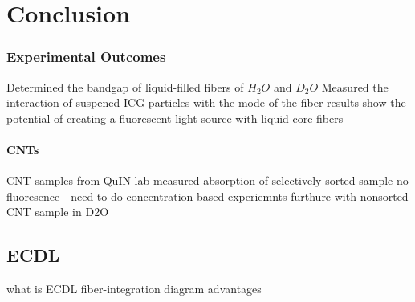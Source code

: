 \chapter{Conclusion}
\subsection{Experimental Outcomes}
Determined the bandgap of liquid-filled fibers of $H_2O$ and $D_2O$ 
Measured the interaction of suspened ICG particles with the mode of the fiber
results show the potential of creating a fluorescent light source with liquid core fibers
\subsubsection{CNTs}
CNT samples from QuIN lab
measured absorption of selectively sorted sample
no fluoresence - need to do concentration-based experiemnts
furthure with nonsorted CNT sample in D2O
\section{ECDL}
what is ECDL
fiber-integration 
diagram
advantages